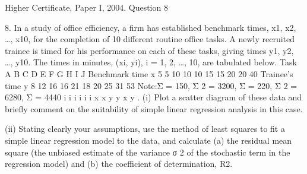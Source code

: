 \documentclass[a4paper,12pt]{article}
\begin{document}
Higher Certificate, Paper I, 2004. Question 8
\begin{framed}



8. In a study of office efficiency, a firm has established benchmark times, x1, x2, …, x10,
for the completion of 10 different routine office tasks. A newly recruited trainee is
timed for his performance on each of these tasks, giving times y1, y2, …, y10. The
times in minutes, (xi, yi), i = 1, 2, …, 10, are tabulated below.
Task A B C D E F G H I J
Benchmark time x 5 5 10 10 10 15 15 20 20 40
Trainee's time y 8 12 16 16 21 18 20 25 31 53
Note:Σ = 150, Σ 2 = 3200, Σ = 220, Σ 2 = 6280, Σ = 4440 i i i i i i x x y y x y .
(i) Plot a scatter diagram of these data and briefly comment on the suitability of
simple linear regression analysis in this case.
\end{framed}

\begin{framed}
(ii) Stating clearly your assumptions, use the method of least squares to fit a
simple linear regression model to the data, and calculate (a) the residual mean
square (the unbiased estimate of the variance σ 2 of the stochastic term in the
regression model) and (b) the coefficient of determination, R2.
\end{framed}
\end{document}
